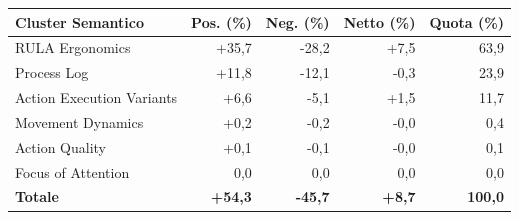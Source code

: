 \begin{tabular*}{\linewidth}{@{}l@{\extracolsep{\fill}}rrrr@{}}
\toprule
\textbf{Cluster Semantico} & \textbf{Pos. (\%)} & \textbf{Neg. (\%)} & \textbf{Netto (\%)} & \textbf{Quota (\%)} \\
\midrule
RULA Ergonomics & +35{,}7 & -28{,}2 & +7{,}5 & 63{,}9 \\
Process Log & +11{,}8 & -12{,}1 & -0{,}3 & 23{,}9 \\
Action Execution Variants & +6{,}6 & -5{,}1 & +1{,}5 & 11{,}7 \\
Movement Dynamics & +0{,}2 & -0{,}2 & -0{,}0 & 0{,}4 \\
Action Quality & +0{,}1 & -0{,}1 & -0{,}0 & 0{,}1 \\
Focus of Attention & 0{,}0 & 0{,}0 & 0{,}0 & 0{,}0 \\
\midrule
\textbf{Totale} & \textbf{+54{,}3} & \textbf{-45{,}7} & \textbf{+8{,}7} & \textbf{100{,}0} \\
\bottomrule
\end{tabular*}
